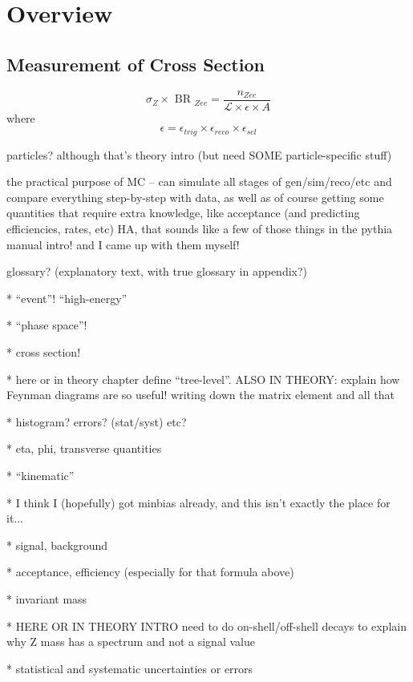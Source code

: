 \chapter{Overview}
\label{over}
\section{Measurement of Cross Section}
\label{over:xsec}
\[
\sigma_{ Z } \times \textrm{ BR }_{ Zee } = \frac{ n_{ Zee } }{  \mathcal{ L } \times \epsilon \times A}
\]
where
\[
\epsilon = \epsilon_{ trig } \times \epsilon_{ reco } \times \epsilon_{ sel }
\]

particles?  although that's theory intro (but need SOME particle-specific stuff) 

the practical purpose of MC -- can simulate all stages of gen/sim/reco/etc and compare 
everything step-by-step with data, as well as of course getting some quantities 
that require extra knowledge, like acceptance (and predicting efficiencies, rates, etc)
HA, that sounds like a few of those things in the pythia manual intro!  and I came 
up with them myself!  

glossary? (explanatory text, with true glossary in appendix?)  

   * ``event''!  ``high-energy''

   * ``phase space''!

   * cross section!

   * here or in theory chapter define ``tree-level''.  
ALSO IN THEORY: explain how Feynman diagrams are so useful! 
writing down the matrix element and all that

   * histogram?  errors? (stat/syst) etc?

   * eta, phi, transverse quantities

   * ``kinematic''

   * I think I (hopefully) got minbias already, and this isn't exactly the place for it... 

   * signal, background

   * acceptance, efficiency (especially for that formula above)

   * invariant mass

   * HERE OR IN THEORY INTRO need to do on-shell/off-shell decays 
to explain why Z mass has a spectrum and not a signal value

   * statistical and systematic uncertainties or errors

